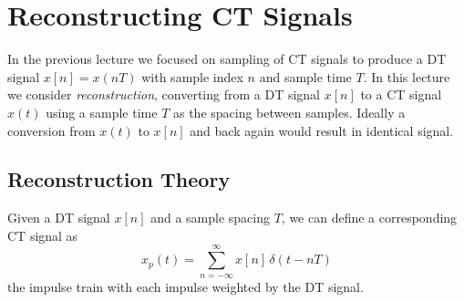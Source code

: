 \section{Reconstructing  CT Signals}

In the previous lecture we focused on sampling of CT signals to produce a DT signal $x[n] = x(nT)$ with sample index $n$ and sample time $T$. In this lecture we consider \emph{reconstruction}, converting from a DT signal $x[n]$ to a CT signal $x(t)$ using a sample time $T$ as the spacing between samples. Ideally a conversion from $x(t)$ to $x[n]$ and back again would result in identical signal. 

\subsection{Reconstruction Theory}
Given a DT signal $x[n]$ and a sample spacing $T$, we can define a corresponding CT signal as 
\[
x_p(t) = \sum\limits_{n = -\infty}^{\infty} x[n] \, \delta(t-nT)
\]
the impulse train with each impulse weighted by the DT signal.

